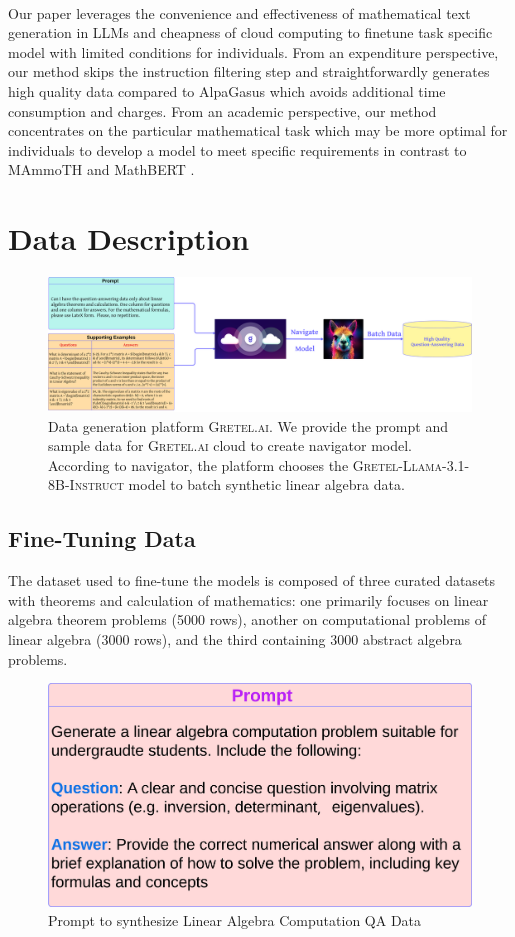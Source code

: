 \documentclass[10pt]{article}
\begin{document}
\\
Our paper leverages the convenience and effectiveness of mathematical text generation in LLMs and cheapness of cloud computing to finetune task specific model with limited conditions for individuals. From an expenditure perspective, our method skips the instruction filtering step and straightforwardly generates high quality data compared to AlpaGasus \cite{Chen2023AlpaGasusTA} which avoids additional time consumption and charges. From an academic perspective, our method concentrates on the particular mathematical task which may be more optimal for individuals to develop a model to meet specific requirements in contrast to MAmmoTH \cite{Yue2023MAmmoTHBM} and MathBERT \cite{Peng2021MathBERTAP}.  

\section{Data Description}\label{sec:data}
\begin{figure}[h]
    \centering
    \includegraphics[width= \linewidth]{Figures/Data Generation LLama.png}
    \caption{Data generation platform \textsc{Gretel.ai}. We provide the prompt and sample data for \textsc{Gretel.ai} cloud to create navigator model. According to navigator, the platform chooses the \textsc{Gretel-Llama-3.1-8B-Instruct} model to batch synthetic linear algebra data.}
    \label{fig:data generation}
\end{figure}
\subsection{Fine-Tuning Data}\label{sec:3.1}
The dataset used to fine-tune the models is composed of three curated datasets with theorems and calculation of mathematics: one primarily focuses on linear algebra theorem problems (5000 rows), another on computational problems of linear algebra (3000 rows), and the third containing 3000 abstract algebra problems.\\
\begin{figure}[h]
    \centering
    \includegraphics[width=0.6\linewidth]{Figures/Calculation Prompt.png}
    \caption{Prompt to synthesize Linear Algebra Computation QA Data }
    \label{fig:cal prompt}
\end{figure}
\end{document}
